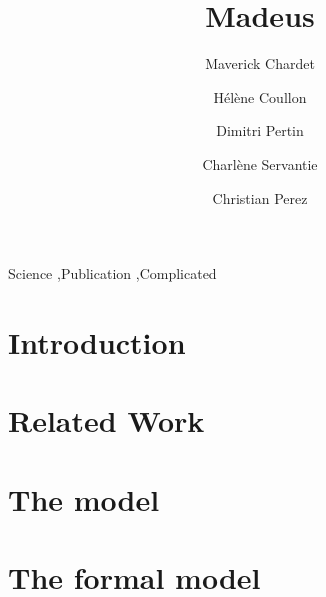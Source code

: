 \documentclass[preprint, 12pt]{elsarticle}
\begin{document}
\begin{frontmatter}

\title{Madeus}

\author[label1]{Maverick Chardet}
\author[label1]{Hélène Coullon}
\author[label1]{Dimitri Pertin}
\author[label1]{Charlène Servantie}
\address[label1]{IMT Atlantique, Inria, LS2N, UBL, F-44307 Nantes, France}

\author[label2]{Christian Perez}
\address[label2]{Univ. Lyon, Inria, CNRS, ENS de Lyon, UCBL 1, LIP, Lyon, France}


\begin{abstract}
\end{abstract}

\begin{keyword}
Science \sep Publication \sep Complicated
\end{keyword}

\end{frontmatter}


\section{Introduction}
\label{sec:introduction}


\section{Related Work}
\label{sec:related_work}


\section{The \mad model}
\label{sec:mad_model}


\section{The formal model}
\label{sec:forma_model}

\end{document}

